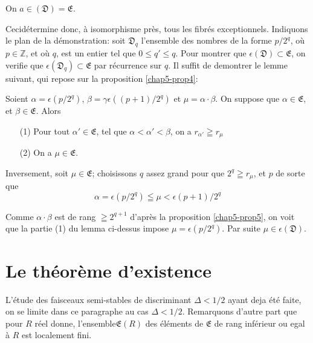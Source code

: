 \medskip

\begin{theorem}\label{chap5-thm1}
On $a\in (\mathfrak{D})=\mathfrak{E}$. 
\end{theorem}

Ceci\pageoriginale d\'etermine donc, \`a isomorphisme pr\`es, tous les
fibr\'es exceptionnels. Indiquons le plan de la d\'emonstration: soit
$\mathfrak{D}_{q}$ l'ensemble des nombres de la forme $p/2^{q}$, o\`u
$p\in \mathbb{Z}$, et o\`u $q$, est un entier tel que $0\leq q'\leq
q$. Pour montrer que $\epsilon(\mathfrak{D})\subset \mathfrak{E}$, on
verifie que $\epsilon(\mathfrak{D}_{q})\subset \mathfrak{E}$ par
r\'ecurrence sur $q$. Il suffit de demontrer le lemme suivant, qui
repose sur la proposition \ref{chap5-prop4}: 

\begin{lemma}\label{chap5-lem1}
Soient $\alpha=\epsilon(p/2^{q})$,
$\beta=\gamma \epsilon((p+1)/2^{q})$ et $\mu=\alpha\cdot \beta$. On
suppose que $\alpha\in \mathfrak{E}$, et
$\beta\in \mathfrak{E}$. Alors
\begin{itemize}
\item[\rm(1)] Pour tout $\alpha'\in \mathfrak{E}$, tel que
$\alpha<\alpha'<\beta$, on a $r_{\alpha'}\geqq r_{\mu}$

\item[\rm(2)] On a $\mu\in \mathfrak{E}$.
\end{itemize}
\end{lemma}

Inversement, soit $\mu\in \mathfrak{E}$; choisissons $q$ assez grand
pour que $2^{q}\geqq r_{\mu}$, et $p$ de sorte que
$$
\alpha=\epsilon(p/2^{q})\leqq \mu <\epsilon(p+1)/2^{q}
$$

Comme $\alpha\cdot \beta$ est de rang $\geqq 2^{q+1}$ d'apr\`es la
proposition \ref{chap5-prop5}, on voit que la partie (1) du lemma
ci-dessus impose $\mu=\epsilon(p/2^{q})$. Par suite
$\mu\in \epsilon(\mathfrak{D})$. 

\section{Le th\'eor\`eme d'existence}\label{chap5-sec6}

L'\'etude des faisceaux semi-stables de discriminant $\Delta<1/2$
ayant deja \'et\'e faite, on se limite dans ce paragraphe au cas
$\Delta<1/2$. Remarquons d'autre part que pour $R$ r\'eel donne, 
l'ensemble\pageoriginale $\mathfrak{E}(R)$ des \'el\'ements de
$\mathfrak{E}$ de rang inf\'erieur ou egal \`a $R$ est localement
fini.

